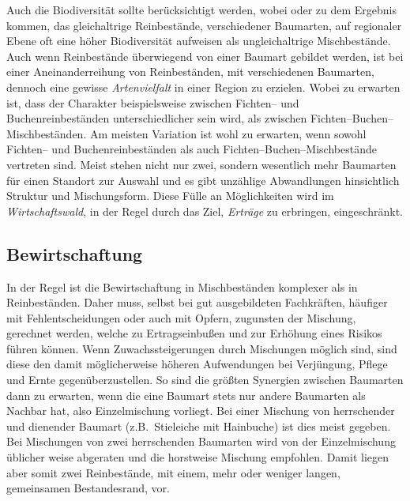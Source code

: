 \documentclass[twocolumn]{scrartcl}
\begin{document}
Auch die Biodiversität sollte berücksichtigt werden, wobei
\cite{heinrichs2019Reinbestand} oder \cite{schall2017Reinbestand} zu
dem Ergebnis kommen, das gleichaltrige Reinbestände, verschiedener
Baumarten, auf regionaler Ebene oft eine höher Biodiversität aufweisen
als ungleichaltrige Mischbestände. Auch wenn Reinbestände überwiegend
von einer Baumart gebildet werden, ist bei einer Aneinanderreihung von
Reinbeständen, mit verschiedenen Baumarten, dennoch eine gewisse
\emph{Artenvielfalt} in einer Region zu erzielen. Wobei zu erwarten
ist, dass der Charakter beispielsweise zwischen Fichten-- und
Buchenreinbeständen unterschiedlicher sein wird, als zwischen
Fichten--Buchen--Mischbeständen. Am meisten Variation ist wohl zu
erwarten, wenn sowohl Fichten-- und Buchenreinbeständen als auch
Fichten--Buchen--Mischbestände vertreten sind. Meist stehen nicht nur
zwei, sondern wesentlich mehr Baumarten für einen Standort zur Auswahl
und es gibt unzählige Abwandlungen hinsichtlich Struktur und
Mischungsform. Diese Fülle an Möglichkeiten wird im
\emph{Wirtschaftswald}, in der Regel durch das Ziel, \emph{Erträge} zu
erbringen, eingeschränkt.

\subsection{Bewirtschaftung}
\label{ssec:bewirtschaftung}

In der Regel ist die Bewirtschaftung in Mischbeständen komplexer als
in Reinbeständen.  Daher muss, selbst bei gut ausgebildeten
Fachkräften, häufiger mit Fehlentscheidungen oder auch mit Opfern,
zugunsten der Mischung, gerechnet werden, welche zu Ertragseinbußen und
zur Erhöhung eines Risikos führen können. Wenn Zuwachssteigerungen
durch Mischungen möglich sind, sind diese den damit möglicherweise
höheren Aufwendungen bei Verjüngung, Pflege und Ernte
gegenüberzustellen. So sind die größten Synergien zwischen Baumarten
dann zu erwarten, wenn die eine Baumart stets nur andere Baumarten als
Nachbar hat, also Einzelmischung vorliegt. Bei einer Mischung von
herrschender und dienender Baumart (z.B.\ Stieleiche mit Hainbuche)
ist dies meist gegeben. Bei Mischungen von zwei herrschenden Baumarten
wird von der Einzelmischung üblicher weise abgeraten und die
horstweise Mischung empfohlen. Damit liegen aber somit zwei
Reinbestände, mit einem, mehr oder weniger langen, gemeinsamen
Bestandesrand, vor.
\end{document}
